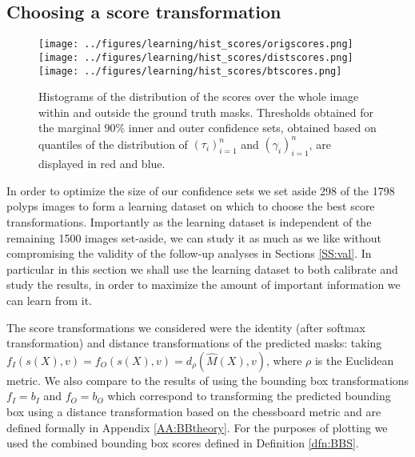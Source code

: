 \subsection{Choosing a score transformation}\label{SS:learn}
\begin{figure}
	\centering
	\texttt{[image: ../figures/learning/hist\_scores/origscores.png]}
	\texttt{[image: ../figures/learning/hist\_scores/distscores.png]}
	\texttt{[image: ../figures/learning/hist\_scores/btscores.png]}
	\caption{Histograms of the distribution of the scores over the whole image within and outside the ground truth masks. Thresholds obtained for the marginal $90\%$ inner and outer confidence sets, obtained based on quantiles of the distribution of $(\tau_i)_{i = 1}^n$ and $(\gamma_i)_{i = 1}^n$, are displayed in red and blue.}
	\label{scorehists}
\end{figure}
In order to optimize the size of our confidence sets we set aside 298 of the 1798 polyps images to form a learning dataset on which to choose the best score transformations. Importantly as the learning dataset is independent of the remaining 1500 images set-aside, we can study it as much as we like without compromising the validity of the follow-up analyses in Sections \ref{SS:val}. In particular in this section we shall use the learning dataset to both calibrate and study the results, in order to maximize the amount of important information we can learn from it.

The score transformations we considered were the identity (after softmax transformation) and distance transformations of the predicted masks:  taking $f_I(s(X), v) = f_O(s(X), v) = d_\rho(\hat{M}(X), v)$, where $\rho$ is the Euclidean metric. We also compare to the results of using the bounding box transformations $f_I = b_I$ and $f_O = b_O$ which correspond to transforming the predicted bounding box using a distance transformation based on the chessboard metric and are defined formally in Appendix \ref{AA:BBtheory}. For the purposes of plotting we used the combined bounding box scores defined in Definition \ref{dfn:BBS}.

